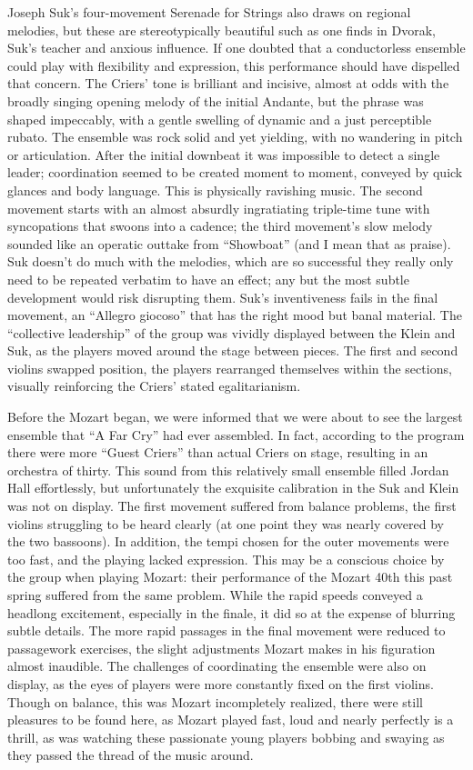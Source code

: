 Joseph Suk’s four-movement Serenade for Strings also draws on regional melodies, but these are stereotypically beautiful such as one finds in Dvorak, Suk’s teacher and anxious influence. If one doubted that a conductorless ensemble could play with flexibility and expression, this performance should have dispelled that concern. The Criers’ tone is brilliant and incisive, almost at odds with the broadly singing opening melody of the initial Andante, but the phrase was shaped impeccably, with a gentle swelling of dynamic and a just perceptible rubato. The ensemble was rock solid and yet yielding, with no wandering in pitch or articulation. After the initial downbeat it was impossible to detect a single leader; coordination seemed to be created moment to moment, conveyed by quick glances and body language. This is physically ravishing music. The second movement starts with an almost absurdly ingratiating triple-time tune with syncopations that swoons into a cadence; the third movement’s slow melody sounded like an operatic outtake from “Showboat” (and I mean that as praise). Suk doesn’t do much with the melodies, which are so successful they really only need to be repeated verbatim to have an effect; any but the most subtle development would risk disrupting them. Suk’s inventiveness fails in the final movement, an “Allegro giocoso” that has the right mood but banal material. The “collective leadership” of the group was vividly displayed between the Klein and Suk, as the players moved around the stage between pieces. The first and second violins swapped position, the players rearranged themselves within the sections, visually reinforcing the Criers’ stated egalitarianism.

Before the Mozart began, we were informed that we were about to see the largest ensemble that “A Far Cry” had ever assembled. In fact, according to the program there were more “Guest Criers” than actual Criers on stage, resulting in an orchestra of thirty. This sound from this relatively small ensemble filled Jordan Hall effortlessly, but unfortunately the exquisite calibration in the Suk and Klein was not on display. The first movement suffered from balance problems, the first violins struggling to be heard clearly (at one point they was nearly covered by the two bassoons). In addition, the tempi chosen for the outer movements were too fast, and the playing lacked expression. This may be a conscious choice by the group when playing Mozart: their performance of the Mozart 40th this past spring suffered from the same problem. While the rapid speeds conveyed a headlong excitement, especially in the finale, it did so at the expense of blurring subtle details. The more rapid passages in the final movement were reduced to passagework exercises, the slight adjustments Mozart makes in his figuration almost inaudible. The challenges of coordinating the ensemble were also on display, as the eyes of players were more constantly fixed on the first violins. Though on balance, this was Mozart incompletely realized, there were still pleasures to be found here, as Mozart played fast, loud and nearly perfectly is a thrill, as was watching these passionate young players bobbing and swaying as they passed the thread of the music around.
